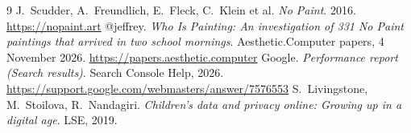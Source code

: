 \documentclass[10pt,letterpaper,twocolumn]{article}
\newcommand{\acdot}{{\color{acpink}.}}
\newcommand{\ac}{\mbox{Aesthetic{\acdot}Computer}}
\begin{document}
{\footnotesize
\begin{thebibliography}{9}\setlength{\itemsep}{1pt}
 J.~Scudder, A.~Freundlich, E.~Fleck, C.~Klein et al. \emph{No Paint}. 2016. \url{https://nopaint.art}
 @jeffrey. \emph{Who Is Painting: An investigation of 331 No Paint paintings that arrived in two school mornings}. \ac{} papers, 4 November 2026. \url{https://papers.aesthetic.computer}
 Google. \emph{Performance report (Search results)}. Search Console Help, 2026. \url{https://support.google.com/webmasters/answer/7576553}
 S.~Livingstone, M.~Stoilova, R.~Nandagiri. \emph{Children's data and privacy online: Growing up in a digital age}. LSE, 2019.
\end{thebibliography}}
\end{document}
